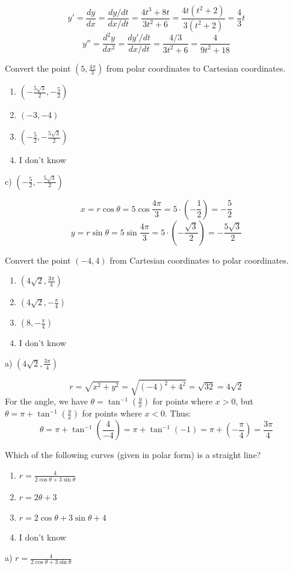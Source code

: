 \documentclass[addpoints,12pt,answers]{exam}
\begin{document}
\begin{questions}
\begin{solution}
    $$y'=\frac{dy}{dx}=\frac{dy/dt}{dx/dt}=\frac{4t^3+8t}{3t^2+6}=\frac{4t(t^2+2)}{3(t^2+2)}=\frac{4}{3}t$$
    $$y''=\frac{d^2 y}{dx^2}=\frac{dy'/dt}{dx/dt}=\frac{4/3}{3t^2+6}=\frac{4}{9t^2+18}$$
  \end{solution}
  \newpage
{}
  \question
  Convert the point $\displaystyle\left(5,\frac{4\pi}{3}\right)$ from polar coordinates to Cartesian coordinates.
  \begin{enumerate}[label=\alph*)]
    \item
    $\displaystyle\left(-\frac{5\sqrt{3}}{2},-\frac{5}{2}\right)$
    \item
    $(-3,-4)$
    \item
    $\displaystyle\left(-\frac{5}{2},-\frac{5\sqrt{3}}{2}\right)$
    \item
    I don't know
  \end{enumerate}
  \begin{solution}
    c) $\displaystyle\left(-\frac{5}{2},-\frac{5\sqrt{3}}{2}\right)$
    
    $$x=r\cos\theta=5\cos\frac{4\pi}{3}=5\cdot\left(-\frac{1}{2}\right)=-\frac{5}{2}$$
    $$y=r\sin\theta=5\sin\frac{4\pi}{3}=5\cdot\left(-\frac{\sqrt{3}}{2}\right)=-\frac{5\sqrt{3}}{2}$$
  \end{solution}
  \newpage
  \question
  Convert the point $(-4,4)$ from Cartesian coordinates to polar coordinates.
  \begin{enumerate}[label=\alph*)]
    \item
    $\displaystyle\left(4\sqrt{2},\frac{3\pi}{4}\right)$
    \item
    $\displaystyle\left(4\sqrt{2},-\frac{\pi}{4}\right)$
    \item
    $\displaystyle\left(8,-\frac{\pi}{4}\right)$
    \item
    I don't know
  \end{enumerate}
  \begin{solution}
    a) $\displaystyle\left(4\sqrt{2},\frac{3\pi}{4}\right)$
    
    $$r=\sqrt{x^2+y^2}=\sqrt{(-4)^2+4^2}=\sqrt{32}=4\sqrt{2}$$
    For the angle, we have $\displaystyle\theta=\tan^{-1}\left(\frac{y}{x}\right)$ for points where $x>0$, but $\displaystyle\theta=\pi+\tan^{-1}\left(\frac{y}{x}\right)$ for points where $x<0$. Thus:
    $$\theta=\pi+\tan^{-1}\left(\frac{4}{-4}\right)=\pi+\tan^{-1}(-1)=\pi+\left(-\frac{\pi}{4}\right)=\frac{3\pi}{4}$$
  \end{solution}
  \newpage
  \question
  Which of the following curves (given in polar form) is a straight line?
  \begin{enumerate}[label=\alph*)]
    \item
    $\displaystyle r=\frac{4}{2\cos\theta+3\sin\theta}$
    \item
    $r=2\theta+3$
    \item
    $r=2\cos\theta+3\sin\theta+4$
    \item
    I don't know
  \end{enumerate}
  \begin{solution}
    a) $\displaystyle r=\frac{4}{2\cos\theta+3\sin\theta}$
    

\end{solution}
\end{questions}
\end{document}
